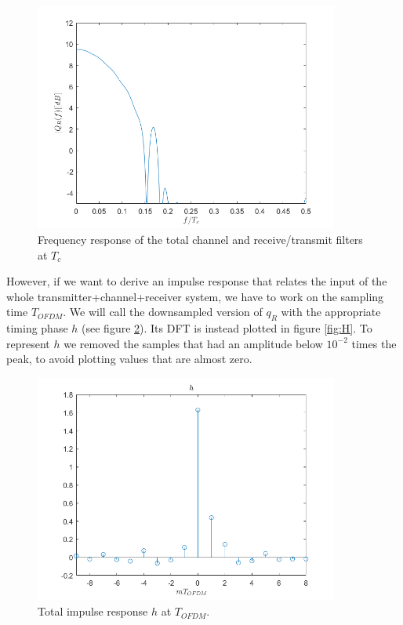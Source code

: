 \documentclass[a4paper,11.5pt]{article}
\begin{document}
\begin{figure}[H]
	\begin{center}   
		\includegraphics[width=10cm]{figs/Qmag_R.png} 
		\caption{Frequency response of the total channel and receive/transmit filters at $T_c$}
		\label{fig:Qmag_R}
	\end{center}
\end{figure}

However, if we want to derive an impulse response that relates the input of the whole transmitter+channel+receiver system, we have to work on the sampling time $T_{OFDM}$. We will call the downsampled version of $q_R$ with the appropriate timing phase $h$ (see figure \ref{fig:h}). Its DFT is instead plotted in figure \ref{fig:H}. To represent $h$ we removed the samples that had an amplitude below $10^{-2}$ times the peak, to avoid plotting values that are almost zero.

\begin{figure}[H]
	\begin{center}   
		\includegraphics[width=10cm]{figs/h.png} 
		\caption{Total impulse response $h$ at $T_{OFDM}$.}
		\label{fig:h}
	\end{center}
\end{figure}
\end{document}
